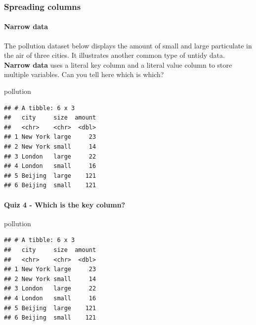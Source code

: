 \documentclass[
]{article}
\newenvironment{Shaded}{\begin{snugshade}}{\end{snugshade}}
\newcommand{\NormalTok}[1]{#1}
\begin{document}
\hypertarget{spreading-columns}{%
\subsubsection{Spreading columns}\label{spreading-columns}}

\hypertarget{narrow-data}{%
\paragraph{Narrow data}\label{narrow-data}}

The pollution dataset below displays the amount of small and large
particulate in the air of three cities. It illustrates another common
type of untidy data. \textbf{Narrow data} uses a literal key column and
a literal value column to store multiple variables. Can you tell here
which is which?

\begin{Shaded}
\begin{Highlighting}[]
\NormalTok{pollution}
\end{Highlighting}
\end{Shaded}

\begin{verbatim}
## # A tibble: 6 x 3
##   city     size  amount
##   <chr>    <chr>  <dbl>
## 1 New York large     23
## 2 New York small     14
## 3 London   large     22
## 4 London   small     16
## 5 Beijing  large    121
## 6 Beijing  small    121
\end{verbatim}

\hypertarget{quiz-4---which-is-the-key-column}{%
\paragraph{Quiz 4 - Which is the key
column?}\label{quiz-4---which-is-the-key-column}}

\begin{Shaded}
\begin{Highlighting}[]
\NormalTok{pollution}
\end{Highlighting}
\end{Shaded}

\begin{verbatim}
## # A tibble: 6 x 3
##   city     size  amount
##   <chr>    <chr>  <dbl>
## 1 New York large     23
## 2 New York small     14
## 3 London   large     22
## 4 London   small     16
## 5 Beijing  large    121
## 6 Beijing  small    121
\end{verbatim}
\end{document}
